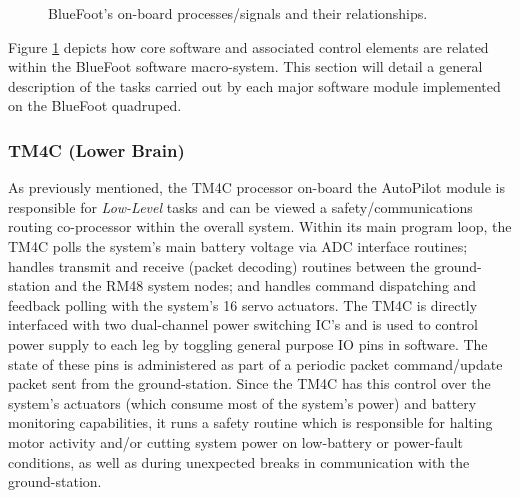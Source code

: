 		\begin{figure}[h!]
			\centering
			\caption{BlueFoot's on-board processes/signals and their relationships.}
			\label{fig::process_diagram}
		\end{figure}

		Figure \ref{fig::process_diagram} depicts how core software and associated control elements are related within the BlueFoot software macro-system. This section will detail a general description of the tasks carried out by each major software module implemented on the BlueFoot quadruped.

		\subsubsection{TM4C (Lower Brain)}

			As previously mentioned, the TM4C processor on-board the AutoPilot module is responsible for \emph{Low-Level} tasks and can be viewed a safety/communications routing co-processor within the overall system. Within its main program loop, the TM4C polls the system's main battery voltage via ADC interface routines; handles transmit and receive (packet decoding) routines between the ground-station and the RM48 system nodes; and handles command dispatching and feedback polling with the system's 16 servo actuators. The TM4C is directly interfaced with two dual-channel power switching IC's and is used to control power supply to each leg by toggling general purpose IO pins in software. The state of these pins is administered as part of a periodic packet command/update packet sent from the ground-station. Since the TM4C has this control over the system's actuators (which consume most of the system's power) and battery monitoring capabilities, it runs a safety routine which is responsible for halting motor activity and/or cutting system power on low-battery or power-fault conditions, as well as during unexpected breaks in communication with the ground-station.

